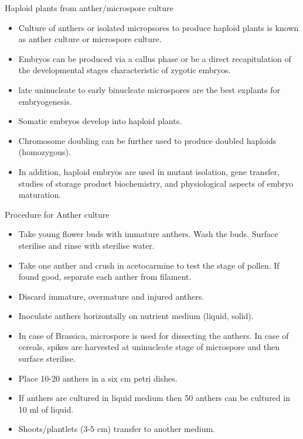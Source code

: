 \documentclass[
  ignorenonframetext,
  aspectratio=169]{beamer}
\providecommand{\tightlist}{%
  \setlength{\itemsep}{0pt}\setlength{\parskip}{0pt}}
\begin{document}
\begin{frame}{Haploid plants from anther/microspore culture}
\protect\hypertarget{haploid-plants-from-anthermicrospore-culture}{}
\begin{itemize}
\tightlist
\item
  Culture of anthers or isolated micropsores to produce haploid plants
  is known as anther culture or microspore culture.
\item
  Embryos can be produced via a callus phase or be a direct
  recapitulation of the developmental stages characteristic of zygotic
  embryos.
\item
  late uninucleate to early binucleate microspores are the best explants
  for embryogenesis.
\item
  Somatic embryos develop into haploid plants.
\item
  Chromosome doubling can be further used to produce doubled haploids
  (homozygous).
\item
  In addition, haploid embryos are used in mutant isolation, gene
  transfer, studies of storage product biochemistry, and physiological
  aspects of embryo maturation.
\end{itemize}
\end{frame}

\begin{frame}{Procedure for Anther culture}
\protect\hypertarget{procedure-for-anther-culture}{}
\begin{itemize}
\tightlist
\item
  Take young flower buds with immature anthers. Wash the buds. Surface
  sterilise and rinse with sterilise water.
\item
  Take one anther and crush in acetocarmine to test the stage of pollen.
  If found good, separate each anther from filament.
\item
  Discard immature, overmature and injured anthers.
\item
  Inoculate anthers horizontally on nutrient medium (liquid, solid).
\item
  In case of Brassica, microspore is used for dissecting the anthers. In
  case of cereals, spikes are harvested at uninucleate stage of
  microspore and then surface sterilise.
\item
  Place 10-20 anthers in a six cm petri dishes.
\item
  If anthers are cultured in liquid medium then 50 anthers can be
  cultured in 10 ml of liquid.
\item
  Shoots/plantlets (3-5 cm) transfer to another medium.
\end{itemize}
\end{frame}
\end{document}
